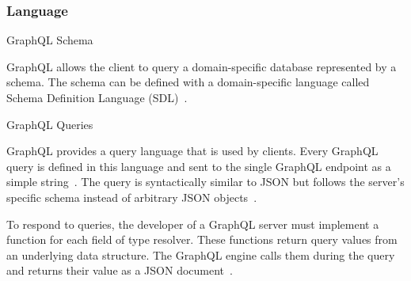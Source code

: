 \begin{frame}\frametitle{Language}

\begin{block}{GraphQL Schema}

GraphQL allows the client to query a domain-specific database represented by a schema. The schema can be defined with a domain-specific language called Schema Definition Language (SDL)~\cite{migrating-to-gql,gql-on-graph-db}.


\end{block}

\begin{block}{GraphQL Queries}

GraphQL provides a query language that is used by clients. Every GraphQL query is defined in this language and sent to the single GraphQL endpoint as a simple string~\cite{migrating-to-gql,real-time-sys-arc-based-on-gql}.
The query is syntactically similar to JSON but follows the server's specific schema instead of arbitrary JSON objects~\cite{gql-on-graph-db,initial-analysis-of-gql}. 

To respond to queries, the developer of a GraphQL server must implement a function for each field of type resolver. These functions return query values from an underlying data structure.  The GraphQL engine calls them during the query and returns their value as a JSON document~\cite{migrating-to-gql,real-time-sys-arc-based-on-gql}. 


\end{block}


\end{frame}

\begin{frame}
\end{frame}

\begin{frame}



\end{frame}

